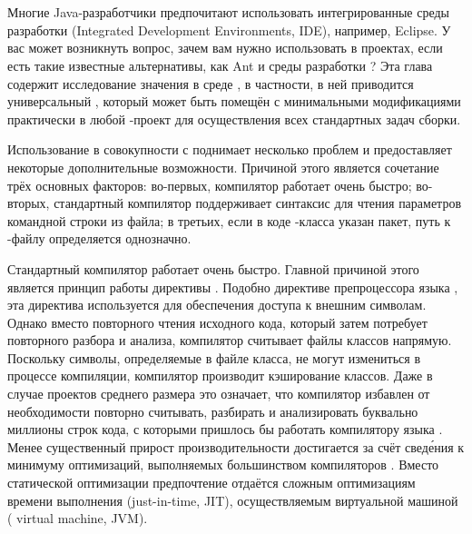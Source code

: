 \chapter{\Java{}}
\label{chap:java}

Многие Java\hyp{}разработчики предпочитают использовать
интегрированные среды разработки (Integrated Development Environments,
IDE), например, Eclipse. У вас может возникнуть вопрос, зачем вам
нужно использовать \GNUmake{} в \Java{} проектах, если есть такие
известные альтернативы, как Ant и среды разработки \Java{}? Эта глава
содержит исследование значения \GNUmake{} в среде \Java{}, в
частности, в ней приводится универсальный \Makefile{}, который может
быть помещён с минимальными модификациями практически в любой
\Java{}\hyp{}проект для осуществления всех стандартных задач сборки.

Использование \GNUmake{} в совокупности с \Java{} поднимает несколько
проблем и предоставляет некоторые дополнительные возможности. Причиной
этого является сочетание трёх основных факторов: во-первых, компилятор
\Java{} работает очень быстро; во-вторых, стандартный компилятор
\Java{} поддерживает синтаксис  для чтения
параметров командной строки из файла; в третьих, если в коде
\Java{}\hyp{}класса указан пакет, путь к \hyp{}файлу
определяется однозначно.

Стандартный компилятор \Java{} работает очень быстро. Главной причиной
этого является принцип работы директивы . Подобно
директиве  препроцессора языка \Clang{}, эта
директива используется для обеспечения доступа к внешним символам.
Однако вместо повторного чтения исходного кода, который затем
потребует повторного разбора и анализа, компилятор \Java{} считывает
файлы классов напрямую. Поскольку символы, определяемые в файле
класса, не могут измениться в процессе компиляции, компилятор
производит кэширование классов. Даже в случае проектов среднего
размера это означает, что компилятор \Java{} избавлен от необходимости
повторно считывать, разбирать и анализировать буквально миллионы строк
кода, с которыми пришлось бы работать компилятору языка \Clang{}.
Менее существенный прирост производительности достигается за счёт
свед\'{е}ния к минимуму оптимизаций, выполняемых большинством
компиляторов \Java{}. Вместо статической оптимизации предпочтение
отдаётся сложным оптимизациям времени выполнения (just-in-time, JIT),
осуществляемым виртуальной машиной \Java{} (\Java{} virtual machine,
JVM).

